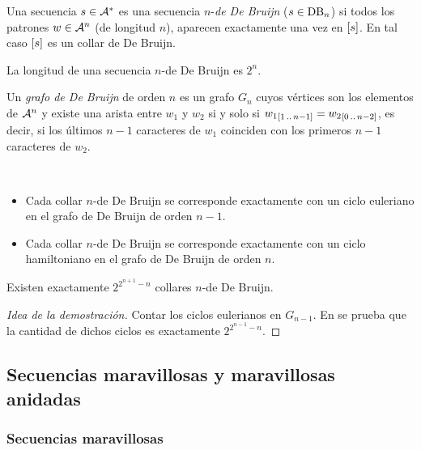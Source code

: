 \documentclass[11pt]{article}
\begin{document}
\begin{definition}
	Una secuencia $s \in \mathcal{A}^*$ es una secuencia $n$-\emph{de De Bruijn}
	($s \in \text{DB}_{n}$) si todos los patrones $w \in \mathcal{A}^n$ (de longitud $n$),
	aparecen exactamente una vez en $\left[s\right]$. En tal caso $\left[s\right]$ es un
	collar de De Bruijn.
\end{definition}

\begin{remark}
	La longitud de una secuencia $n$-de De Bruijn es $2^n$.
\end{remark}

\begin{definition}
	Un \emph{grafo de De Bruijn} de orden $n$ es un grafo $G_n$ cuyos vértices
	son los elementos de $\mathcal{A}^n$ y existe una arista entre $w_1$ y $w_2$ si
	y solo si ${w_1}_{[1\,..\,n-1]} = {w_2}_{[0\,..\,n-2]}$, es decir, si los
	últimos $n-1$ caracteres de $w_1$ coinciden con los primeros $n-1$ caracteres
	de $w_2$.
\end{definition}

\begin{remark}\ %
	\begin{itemize}
		\item Cada collar $n$-de De Bruijn se corresponde exactamente con un ciclo
		      euleriano en el grafo de De Bruijn de orden $n - 1$.
		\item Cada collar $n$-de De Bruijn se corresponde exactamente con un ciclo
		      hamiltoniano en el grafo de De Bruijn de orden $n$.
	\end{itemize}
\end{remark}

\begin{proposition}
	Existen exactamente $2^{2^{n+1} - n}$ collares $n$-de De Bruijn.
\end{proposition}

\begin{proof}[Idea de la demostración]
	Contar los ciclos eulerianos en $G_{n-1}$.
	En \cite{de-bruijn-combinatorial-problem} se prueba que la cantidad de dichos ciclos es exactamente
	$2^{2^{n-1} - n}$.
\end{proof}

\subsection{Secuencias maravillosas y maravillosas anidadas}

\subsubsection{Secuencias maravillosas}
\end{document}
